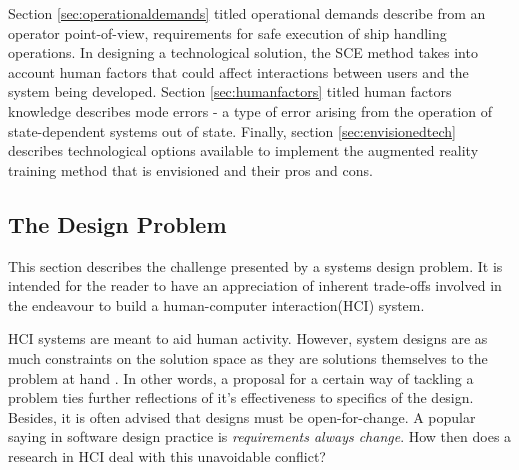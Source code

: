 Section \ref{sec:operationaldemands} titled operational demands describe from an operator point-of-view, requirements for safe execution of ship handling operations. In designing a technological solution, the SCE method takes into account human factors that could affect interactions between users and the system being developed. Section \ref{sec:humanfactors} titled human factors knowledge describes mode errors - a type of error arising from the operation of state-dependent systems out of state. Finally, section \ref{sec:envisionedtech} describes technological options available to implement the augmented reality training method that is envisioned and  their pros and cons.
%
%


\subsection{The Design Problem}
\label{sec:designchallenge}
This section describes the challenge presented by a systems design problem. It is intended for the reader to have an appreciation of inherent trade-offs involved in the endeavour to build a human-computer interaction(HCI) system.

HCI systems are meant to aid human activity. However, system designs are as much constraints on the solution space as they are solutions themselves to the problem at hand \parencite{carroll2000five}. In other words, a proposal for a certain way of tackling a problem ties further reflections of it's effectiveness to specifics of the design. Besides, it is often advised that designs must be open-for-change. A popular saying in software design practice is \textit{requirements always change}. How then does a research in HCI deal with this unavoidable conflict?

